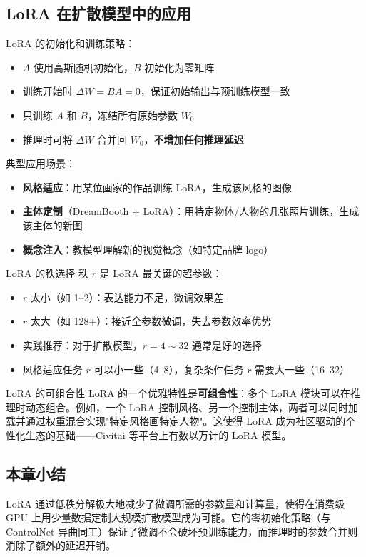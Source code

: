 \subsection{LoRA 在扩散模型中的应用}

LoRA 的初始化和训练策略：

\begin{itemize}
    \item $A$ 使用高斯随机初始化，$B$ 初始化为零矩阵
    \item 训练开始时 $\Delta W = BA = 0$，保证初始输出与预训练模型一致
    \item 只训练 $A$ 和 $B$，冻结所有原始参数 $W_0$
    \item 推理时可将 $\Delta W$ 合并回 $W_0$，\textbf{不增加任何推理延迟}
\end{itemize}

典型应用场景：
\begin{itemize}
    \item \textbf{风格适应}：用某位画家的作品训练 LoRA，生成该风格的图像
    \item \textbf{主体定制}（DreamBooth + LoRA）：用特定物体/人物的几张照片训练，生成该主体的新图
    \item \textbf{概念注入}：教模型理解新的视觉概念（如特定品牌 logo）
\end{itemize}

\begin{warningbox}{LoRA 的秩选择}
秩 $r$ 是 LoRA 最关键的超参数：
\begin{itemize}
    \item $r$ 太小（如 1--2）：表达能力不足，微调效果差
    \item $r$ 太大（如 128+）：接近全参数微调，失去参数效率优势
    \item 实践推荐：对于扩散模型，$r = 4 \sim 32$ 通常是好的选择
    \item 风格适应任务 $r$ 可以小一些（4--8），复杂条件任务 $r$ 需要大一些（16--32）
\end{itemize}
\end{warningbox}

\begin{knowledgebox}{LoRA 的可组合性}
LoRA 的一个优雅特性是\textbf{可组合性}：多个 LoRA 模块可以在推理时动态组合。例如，一个 LoRA 控制风格、另一个控制主体，两者可以同时加载并通过权重混合实现"特定风格画特定人物"。这使得 LoRA 成为社区驱动的个性化生态的基础——Civitai 等平台上有数以万计的 LoRA 模型。
\end{knowledgebox}

\subsection{本章小结}

LoRA 通过低秩分解极大地减少了微调所需的参数量和计算量，使得在消费级 GPU 上用少量数据定制大规模扩散模型成为可能。它的零初始化策略（与 ControlNet 异曲同工）保证了微调不会破坏预训练能力，而推理时的参数合并则消除了额外的延迟开销。

\newpage

